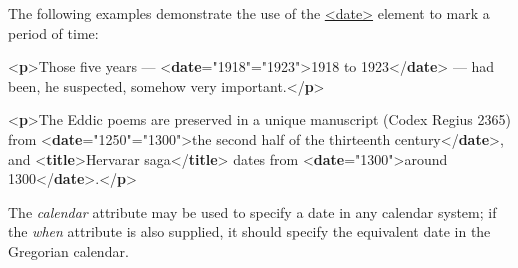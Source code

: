 The following examples demonstrate the use of the \hyperref[TEI.date]{<date>} element to mark a period of time:\par\bgroup{}\exampleFont \begin{shaded}\noindent\mbox{}{<\textbf{p}>}Those five years —\mbox{}\newline 
{<\textbf{date}\hspace*{1em}{from}="{1918}"\hspace*{1em}{to}="{1923}">}1918 to 1923{</\textbf{date}>}\mbox{}\newline 
 — had been, he suspected,\mbox{}\newline 
 somehow very important.{</\textbf{p}>}\end{shaded}\egroup\par \noindent  \par\bgroup{}\exampleFont \begin{shaded}\noindent\mbox{}{<\textbf{p}>}The Eddic poems are preserved in a unique\mbox{}\newline 
 manuscript (Codex Regius 2365) from\mbox{}\newline 
{<\textbf{date}\hspace*{1em}{notBefore}="{1250}"\hspace*{1em}{notAfter}="{1300}">}the second half of the\mbox{}\newline 
\hspace*{1em}\hspace*{1em} thirteenth century{</\textbf{date}>}, and {<\textbf{title}>}Hervarar\mbox{}\newline 
\hspace*{1em}\hspace*{1em} saga{</\textbf{title}>} dates from {<\textbf{date}\hspace*{1em}{when}="{1300}">}around 1300{</\textbf{date}>}.{</\textbf{p}>}\end{shaded}\egroup\par \par
The {\itshape calendar} attribute may be used to specify a date in any calendar system; if the {\itshape when} attribute is also supplied, it should specify the equivalent date in the Gregorian calendar.

